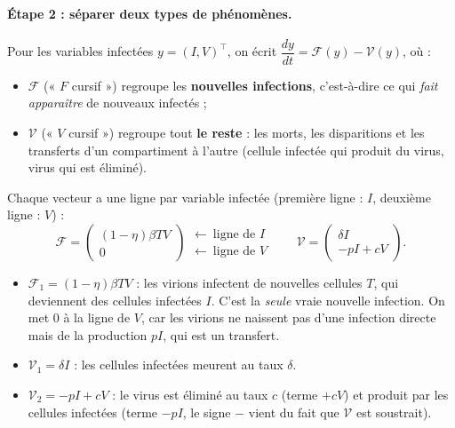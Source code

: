 \documentclass[11pt,a4paper]{report}
\theoremstyle{plain}
\theoremstyle{definition}
\theoremstyle{remark}
\begin{document}
\paragraph{Étape 2 : séparer deux types de phénomènes.} Pour les variables infectées $y=(I,V)^{\!\top}$, on écrit $\dfrac{dy}{dt}=\mathcal F(y)-\mathcal V(y)$, où :
\begin{itemize}
    \item $\mathcal F$ (« $F$ cursif ») regroupe les \textbf{nouvelles infections}, c'est-à-dire ce qui \emph{fait apparaître} de nouveaux infectés ;
    \item $\mathcal V$ (« $V$ cursif ») regroupe tout \textbf{le reste} : les morts, les disparitions et les transferts d'un compartiment à l'autre (cellule infectée qui produit du virus, virus qui est éliminé).
\end{itemize}
Chaque vecteur a une ligne par variable infectée (première ligne : $I$, deuxième ligne : $V$) :
$$\mathcal F=\begin{pmatrix}(1-\eta)\beta TV\\0\end{pmatrix}\begin{matrix}\leftarrow\ \text{ligne de }I\\\leftarrow\ \text{ligne de }V\end{matrix}\qquad
\mathcal V=\begin{pmatrix}\delta I\\-pI+cV\end{pmatrix}.$$
\begin{itemize}
    \item $\mathcal F_1=(1-\eta)\beta TV$ : les virions infectent de nouvelles cellules $T$, qui deviennent des cellules infectées $I$. C'est la \emph{seule} vraie nouvelle infection. On met $0$ à la ligne de $V$, car les virions ne naissent pas d'une infection directe mais de la production $pI$, qui est un transfert.
    \item $\mathcal V_1=\delta I$ : les cellules infectées meurent au taux $\delta$.
    \item $\mathcal V_2=-pI+cV$ : le virus est éliminé au taux $c$ (terme $+cV$) et produit par les cellules infectées (terme $-pI$, le signe $-$ vient du fait que $\mathcal V$ est soustrait).
\end{itemize}
\end{document}

